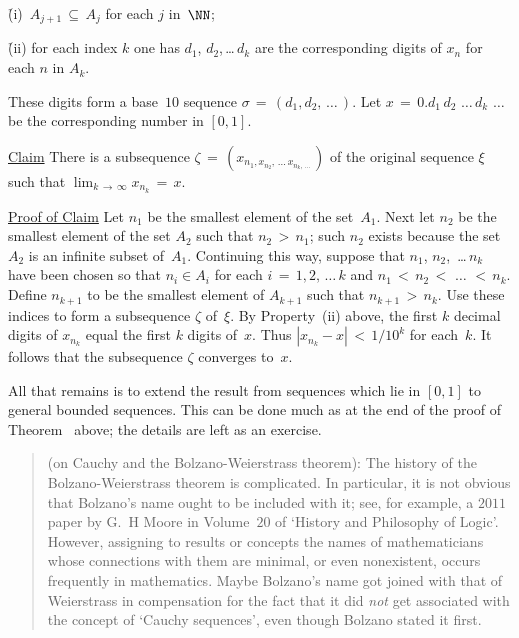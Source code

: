 {\VA

        \h (i)\, $A_{j+1} \,{\subseteq}\, A_{j}$ for each $j$ in~${\NN}$;

        \h (ii) for each index $k$ one has $d_{1}$, $d_{2}$,\,{\ldots}\,$d_{k}$ are the corresponding digits of $x_{n}$ for each $n$ in $A_{k}$.

\VA

\noindent These digits form a base~$10$ sequence ${\sigma} \,=\, (d_{1}, d_{2},\,{\ldots}\,)$.
    Let $x \,=\, 0.d_{1}\,d_{2}\,\,{\ldots}\,d_{k}\,\,{\ldots}\,$ be the corresponding number in $[0,1]$.

        \underline{Claim} There is a subsequence ${\zeta} \,=\, (x_{n_{1}, x_{n_{2}},\,{\ldots}\,x_{n_{k},\,{\ldots}\,}})$
    of the original sequence ${\xi}$ such that $\lim_{k \,{\rightarrow}\, {\infty}} x_{n_{k}} \,=\, x$.

        \underline{Proof of Claim} Let $n_{1}$ be the smallest element of the set~$A_{1}$.
    Next let $n_{2}$ be the smallest element of the set $A_{2}$ such that $n_{2}\,>\,n_{1}$;
    such $n_{2}$ exists because the set $A_{2}$ is an infinite subset of~$A_{1}$.
    Continuing this way, suppose that $n_{1}$, $n_{2}$, \,{\ldots}\,$n_{k}$ have been chosen so that $n_{i}{\in}A_{i}$ for each $i \,=\, 1,2,\,{\ldots}\,k$
    and $n_{1}\,<\,n_{2}\,<\,\,{\ldots}\,\,<\,n_{k}$. Define $n_{k+1}$ to be the smallest element of $A_{k+1}$ such that $n_{k+1}\,>\,n_{k}$.
    Use these indices to form a subsequence ${\zeta}$ of~${\xi}$.
    By Property~(ii) above, the first $k$ decimal digits of $x_{n_{k}}$ equal the first $k$ digits of~$x$.
    Thus $|x_{n_{k}}-x|\,<\,1/10^{k}$ for each~$k$. It follows that the subsequence ${\zeta}$ converges to~$x$.

        All that remains is to extend the result from sequences which lie in $[0,1]$ to general bounded sequences.
    This can be done much as at the end of the proof of Theorem~ above; the details are left as an exercise.

\VV

\begin{quotation}
{\footnotesize \underline{\Note} (on Cauchy and the Bolzano-Weierstrass theorem):
        The history of the Bolzano-Weierstrass theorem is complicated. In particular,
    it is not obvious that Bolzano's name ought to be included with it; see, for example,
    a $2011$ paper by G.~H Moore in Volume~$20$ of `History and Philosophy of Logic'.
    However, assigning to results or concepts the names of mathematicians whose connections with them are minimal, or even nonexistent,
    occurs frequently in mathematics. Maybe Bolzano's name got joined with that of Weierstrass
    in compensation for the fact that it did {\em not} get associated with the concept of `Cauchy sequences', even though Bolzano stated it first.

}
\end{quotation}}
